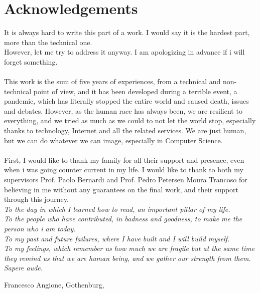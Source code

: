 \thispagestyle{plain_cover}			%
\section*{Acknowledgements}
 It is always hard to write this part of a work. I would say it is the hardest part, more than the technical one.\\
However, let me try to address it anyway. I am apologizing in advance if i will forget something.\\\\

This work is the sum of five years of experiences, from a technical and non-technical point of view, and it has been developed during a terrible event, a pandemic, which has literally stopped the entire world and caused death, issues and debates. However, as the human race has always been, we are resilient to everything, and we tried as much as we could to not let the world stop, especially thanks to technology, Internet and all the related services.
We are just human, but we can do whatever we can image, especially in Computer Science.\\\\

First, I would like to thank my family for all their support and presence, even when i was going counter current in my life.
I would like to thank to both my supervisors Prof. Paolo Bernardi and Prof. Pedro Petersen Moura Trancoso for believing in me without any guarantees on the final work, and their support through this journey.\\

\textit{To the day in which I learned how to read, an important pillar of my life.\\
To the people who have contributed, in badness and goodness, to make me the person who i am today.\\
To my past and future failures, where I have built and I will build myself.\\
To my feelings, which remember us how much we are fragile but at the same time they remind us that we are human being, and we gather our strength from them.\\
Sapere aude.\\}

\vspace{1.5cm}
\hfill
Francesco Angione, Gothenburg, \monthname \space \the\year

\newpage				%
\thispagestyle{empty}
\mbox{}